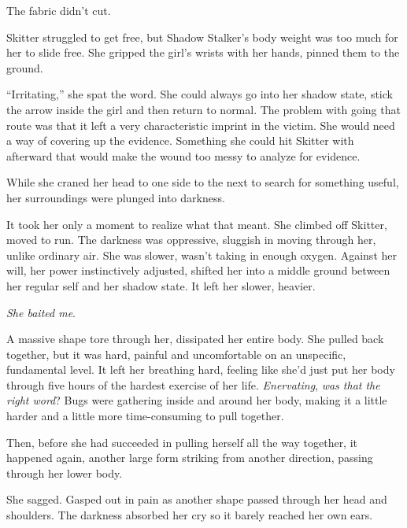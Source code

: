 The fabric didn't cut.



Skitter struggled to get free, but Shadow Stalker's body weight was too much for her to slide free.  She gripped the girl's wrists with her hands, pinned them to the ground.



``Irritating,'' she spat the word.  She could always go into her shadow state, stick the arrow inside the girl and then return to normal.  The problem with going that route was that it left a very characteristic imprint in the victim.  She would need a way of covering up the evidence.  Something she could hit Skitter with afterward that would make the wound too messy to analyze for evidence.



While she craned her head to one side to the next to search for something useful, her surroundings were plunged into darkness.



It took her only a moment to realize what that meant.  She climbed off Skitter, moved to run.  The darkness was oppressive, sluggish in moving through her, unlike ordinary air.  She was slower, wasn't taking in enough oxygen.  Against her will, her power instinctively adjusted, shifted her into a middle ground between her regular self and her shadow state.  It left her slower, heavier.



\emph{She baited me}.



A massive shape tore through her, dissipated her entire body.  She pulled back together, but it was hard, painful and uncomfortable on an unspecific, fundamental level.  It left her breathing hard, feeling like she'd just put her body through five hours of the hardest exercise of her life.  \emph{Enervating}, \emph{was that the right word}?  Bugs were gathering inside and around her body, making it a little harder and a little more time-consuming to pull together.



Then, before she had succeeded in pulling herself all the way together, it happened again, another large form striking from another direction, passing through her lower body.



She sagged.  Gasped out in pain as another shape passed through her head and shoulders.  The darkness absorbed her cry so it barely reached her own ears.



